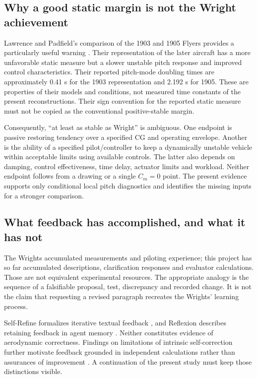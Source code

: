 \documentclass[11pt,a4paper]{article}
\begin{document}
\subsection{Why a good static margin is not the Wright achievement}
Lawrence and Padfield's comparison of the 1903 and 1905 Flyers provides a particularly useful warning \cite{ref10}. Their representation of the later aircraft has a more unfavorable static measure but a slower unstable pitch response and improved control characteristics. Their reported pitch-mode doubling times are approximately 0.41 s for the 1903 representation and 2.192 s for 1905. These are properties of their models and conditions, not measured time constants of the present reconstructions. Their sign convention for the reported static measure must not be copied as the conventional positive-stable margin.

Consequently, ``at least as stable as Wright'' is ambiguous. One endpoint is passive restoring tendency over a specified CG and operating envelope. Another is the ability of a specified pilot/controller to keep a dynamically unstable vehicle within acceptable limits using available controls. The latter also depends on damping, control effectiveness, time delay, actuator limits and workload. Neither endpoint follows from a drawing or a single $C_m=0$ point. The present evidence supports only conditional local pitch diagnostics and identifies the missing inputs for a stronger comparison.

\subsection{What feedback has accomplished, and what it has not}
The Wrights accumulated measurements and piloting experience; this project has so far accumulated descriptions, clarification responses and evaluator calculations. Those are not equivalent experimental resources. The appropriate analogy is the sequence of a falsifiable proposal, test, discrepancy and recorded change. It is not the claim that requesting a revised paragraph recreates the Wrights' learning process.

Self-Refine formalizes iterative textual feedback \cite{ref30}, and Reflexion describes retaining feedback in agent memory \cite{ref32}. Neither constitutes evidence of aerodynamic correctness. Findings on limitations of intrinsic self-correction further motivate feedback grounded in independent calculations rather than assurances of improvement \cite{ref31}. A continuation of the present study must keep those distinctions visible.
\end{document}
